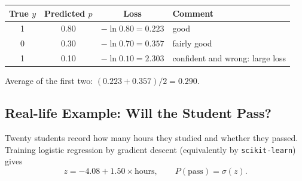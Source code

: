 \begin{example}
\begin{center}
\begin{tabular}{@{}cccl@{}}
\toprule
True $y$ & Predicted $p$ & Loss & Comment\\
\midrule
1 & 0.80 & $-\ln0.80=0.223$ & good\\
0 & 0.30 & $-\ln0.70=0.357$ & fairly good\\
1 & 0.10 & $-\ln0.10=2.303$ & confident and wrong: large loss\\
\bottomrule
\end{tabular}
\end{center}
Average of the first two: $(0.223+0.357)/2=0.290$.
\end{example}

\subsection{Real-life Example: Will the Student Pass?}

Twenty students record how many hours they studied and whether they passed. Training logistic regression by gradient descent (equivalently by \texttt{scikit-learn}) gives
\[
  z=-4.08+1.50\times\text{hours},\qquad P(\text{pass})=\sigma(z).
\]

